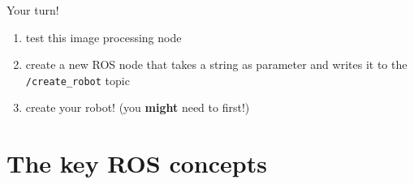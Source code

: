 \documentclass[compress]{beamer}
\begin{document}
\begin{frame}[plain]{}
    \begin{center}
        \Large
        Your turn!

        \begin{enumerate}
            \item test this image processing node
            \item create a new ROS node that takes a string as parameter and
                writes it to the \texttt{/create\_robot} topic
            \item create your robot! \small{(you \textbf{might} need to  first!)}

        \end{enumerate}
    \end{center}
\end{frame}


\section[Key concepts]{The key ROS concepts}
\end{document}
